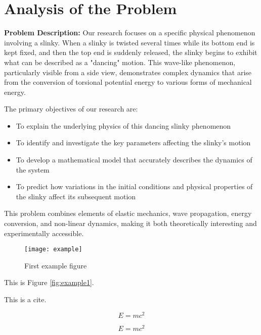 \documentclass{mcmthesis}  %
\begin{document}
\section{Analysis of the Problem}  %

\textbf{Problem Description:} Our research focuses on a specific physical phenomenon involving a slinky. When a slinky is twisted several times while its bottom end is kept fixed, and then the top end is suddenly released, the slinky begins to exhibit what can be described as a "dancing" motion. This wave-like phenomenon, particularly visible from a side view, demonstrates complex dynamics that arise from the conversion of torsional potential energy to various forms of mechanical energy. 

The primary objectives of our research are:
\begin{itemize}
\item To explain the underlying physics of this dancing slinky phenomenon
\item To identify and investigate the key parameters affecting the slinky's motion
\item To develop a mathematical model that accurately describes the dynamics of the system
\item To predict how variations in the initial conditions and physical properties of the slinky affect its subsequent motion
\end{itemize}

This problem combines elements of elastic mechanics, wave propagation, energy conversion, and non-linear dynamics, making it both theoretically interesting and experimentally accessible.

\begin{figure}[h]  %
\small
\centering  %
\texttt{[image: example]}  %
\caption{First example figure} \label{fig:example1}  %
\end{figure}  %

This is Figure \eqref{fig:example1}.  %

This is a cite\cite{vaswani2017attention}.  %

\begin{equation}  %
E = mc^2 \label{aa}  %
\end{equation}  %

\begin{equation}  %
\nonumber %
E = mc^2
\end{equation}  %
\end{document}
